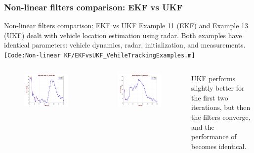 \subsubsection{Non-linear filters comparison: EKF vs UKF}
\begin{frame}{Non-linear filters comparison: EKF vs UKF}
Example 11 (EKF) and Example 13 (UKF) dealt with vehicle location estimation using radar. Both examples have identical parameters: vehicle dynamics, radar, initialization, and measurements. \texttt{\tiny{[Code:Non-linear KF/EKFvsUKF\_VehileTrackingExamples.m]}}

\begin{columns}
        \begin{figure}
            \centering
            \includegraphics[width=0.6\linewidth]{Figures//Part3/EKFvsUKF_Error_Xcoord.png}
        \end{figure}
        \vspace{-10pt}
        \begin{figure}
            \centering
            \includegraphics[width=0.6\linewidth]{Figures//Part3/EKFvsUKF_Error_Ycoord.png}
        \end{figure}
        UKF performs slightly better for the first two iterations, but then the filters converge, and the performance of becomes identical.

\end{columns}
\end{frame}
